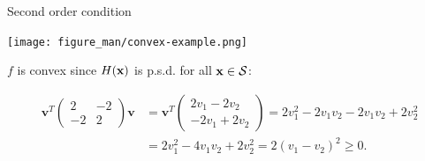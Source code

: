 \documentclass[11pt,compress,t,notes=noshow, xcolor=table]{beamer}
\begin{document}
\begin{vbframe}{Second order condition}
\begin{footnotesize}
\begin{center}
  \texttt{[image: figure\_man/convex-example.png]}
\end{center}


$f$ is convex since $H(\mathbf{x})$ is p.s.d. for all $\mathbf{x}\in\mathcal{S}$:

\begin{align*}
    \mathbf{v}^T\begin{pmatrix} 2 & -2 \\ -2 & 2 \end{pmatrix}\mathbf{v} &= \mathbf{v}^T \begin{pmatrix} 2v_1 - 2v_2 \\ -2v_1 + 2v_2\end{pmatrix} = 2v_1^2 - 2v_1v_2 -2v_1v_2 + 2v_2^2 \\
    &= 2v_1^2 - 4v_1v_2 + 2v_2^2 = 2 (v_1 - v_2)^2 \ge 0.
\end{align*}


\end{footnotesize}

\end{vbframe}
\end{document}
